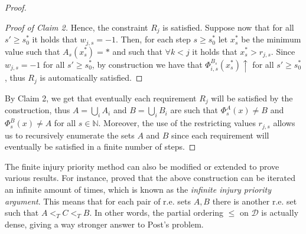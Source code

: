 \documentclass[12pt,a4paper]{article}
\theoremstyle{definition}
\newcommand{\N}{\mathbb{N}}                     %
\begin{document}
\begin{proof}
\begin{proof}[Proof of Claim 2]
        Hence, the constraint $R_j$ is satisfied. Suppose now that for all $s' \geq s_0^*$ it holds that $w_{j,s} = -1$. Then, for each step $s \geq s_0^*$ let $x^*_s$ be the minimum value such that $A_s(x^*_s) = *$ and such that $\forall k < j$ it holds that $x^*_s > r_{j,s}$. Since $w_{j,s} = -1$ for all $s' \geq s_0^*$, by construction we have that $\Phi_{i,s}^{B_s}(x^*_s) \uparrow$ for all $s' \geq s_0^*$, thus $R_j$ is automatically satisfied. 
    \end{proof}

    By Claim 2, we get that eventually each requirement $R_j$ will be satisfied by the construction, thus $A = \bigcup_{i} A_i$ and $B = \bigcup_{i} B_i$ are such that $\Phi_s^A(x) \neq B$ and $\Phi_s^B(x) \neq A$ for all $s \in \N$. Moreover, the use of the restricting values $r_{j,s}$ allows us to recursively enumerate the sets $A$ and $B$ since each requirement will eventually be satisfied in a finite number of steps.

    \end{proof}

    The finite injury priority method can also be modified or extended to prove various results. For instance, \textcite{sacks} proved that the above construction can be iterated an infinite amount of times, which is known as the \textit{infinite injury priority argument}. This means that for each pair of r.e. sets $A,B$ there is another r.e. set such that $A <_T C <_T B$. In other words, the partial ordering $\leq$ on $\mathcal{D}$ is actually dense, giving a way stronger answer to Post's problem.

    \newpage
    \printbibliography
\end{document}
